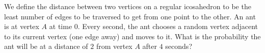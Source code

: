 We define the distance between two vertices on a regular icosahedron to be the least number of edges to be traversed to get from one point to the other. An ant is at vertex $A$ at time $0$. Every second, the ant chooses a random vertex adjacent to its current vertex (one edge away) and moves to it. What is the probability the ant will be at a distance of $2$ from vertex $A$ after $4$ seconds?
